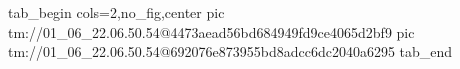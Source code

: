  
 
 
 
 

\qqSecOrig


\ifcmt
  tab_begin cols=2,no_fig,center
    pic tm://01_06_22.06.50.54@4473aead56bd684949fd9ce4065d2bf9
    pic tm://01_06_22.06.50.54@692076e873955bd8adcc6dc2040a6295
  tab_end
\fi

